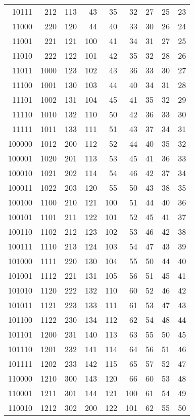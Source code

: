 \documentclass[12pt]{article}
\begin{document}
\begin{tabular}{|r|r|r|r|r|r|r|r|r|}
10111 & 212 & 113 & 43 & 35 & 32 & 27 & 25 & 23 \\
11000 & 220 & 120 & 44 & 40 & 33 & 30 & 26 & 24 \\
11001 & 221 & 121 & 100 & 41 & 34 & 31 & 27 & 25 \\
11010 & 222 & 122 & 101 & 42 & 35 & 32 & 28 & 26 \\
11011 & 1000 & 123 & 102 & 43 & 36 & 33 & 30 & 27 \\
11100 & 1001 & 130 & 103 & 44 & 40 & 34 & 31 & 28 \\
11101 & 1002 & 131 & 104 & 45 & 41 & 35 & 32 & 29 \\
11110 & 1010 & 132 & 110 & 50 & 42 & 36 & 33 & 30 \\
11111 & 1011 & 133 & 111 & 51 & 43 & 37 & 34 & 31 \\
100000 & 1012 & 200 & 112 & 52 & 44 & 40 & 35 & 32 \\
100001 & 1020 & 201 & 113 & 53 & 45 & 41 & 36 & 33 \\
100010 & 1021 & 202 & 114 & 54 & 46 & 42 & 37 & 34 \\
100011 & 1022 & 203 & 120 & 55 & 50 & 43 & 38 & 35 \\
100100 & 1100 & 210 & 121 & 100 & 51 & 44 & 40 & 36 \\
100101 & 1101 & 211 & 122 & 101 & 52 & 45 & 41 & 37 \\
100110 & 1102 & 212 & 123 & 102 & 53 & 46 & 42 & 38 \\
100111 & 1110 & 213 & 124 & 103 & 54 & 47 & 43 & 39 \\
101000 & 1111 & 220 & 130 & 104 & 55 & 50 & 44 & 40 \\
101001 & 1112 & 221 & 131 & 105 & 56 & 51 & 45 & 41 \\
101010 & 1120 & 222 & 132 & 110 & 60 & 52 & 46 & 42 \\
101011 & 1121 & 223 & 133 & 111 & 61 & 53 & 47 & 43 \\
101100 & 1122 & 230 & 134 & 112 & 62 & 54 & 48 & 44 \\
101101 & 1200 & 231 & 140 & 113 & 63 & 55 & 50 & 45 \\
101110 & 1201 & 232 & 141 & 114 & 64 & 56 & 51 & 46 \\
101111 & 1202 & 233 & 142 & 115 & 65 & 57 & 52 & 47 \\
110000 & 1210 & 300 & 143 & 120 & 66 & 60 & 53 & 48 \\
110001 & 1211 & 301 & 144 & 121 & 100 & 61 & 54 & 49 \\
110010 & 1212 & 302 & 200 & 122 & 101 & 62 & 55 & 50 \\
\end{tabular}
\end{document}
